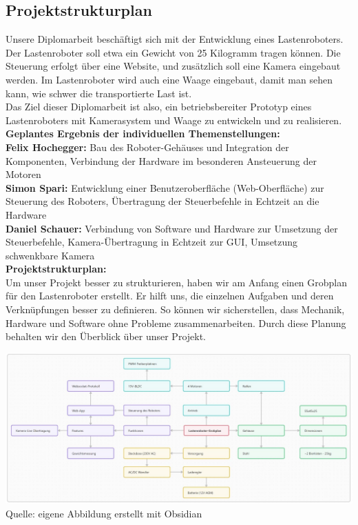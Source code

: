 \documentclass[ngerman,12pt,a4paper]{article}
\begin{document}
		\subsection{Projektstrukturplan} %
		Unsere Diplomarbeit beschäftigt sich mit der Entwicklung eines Lastenroboters. Der Lastenroboter soll etwa ein Gewicht von 25 Kilogramm tragen können. Die Steuerung erfolgt über eine Website, und zusätzlich soll eine Kamera eingebaut werden. Im Lastenroboter wird auch eine Waage eingebaut, damit man sehen kann, wie schwer die transportierte Last ist. \\ Das Ziel dieser Diplomarbeit ist also, ein betriebsbereiter Prototyp eines Lastenroboters mit Kamerasystem und Waage zu entwickeln und zu realisieren. \\[0.4cm]
		\textbf{Geplantes Ergebnis der individuellen Themenstellungen:} \\
		\textbf{Felix Hochegger:}
		Bau des Roboter-Gehäuses und Integration der Komponenten, Verbindung der Hardware im besonderen Ansteuerung der Motoren \\
		\textbf{Simon Spari:}
		Entwicklung einer Benutzeroberfläche (Web-Oberfläche) zur Steuerung des Roboters, Übertragung der Steuerbefehle in Echtzeit an die Hardware \\
		\textbf{Daniel Schauer:}
		Verbindung von Software und Hardware zur Umsetzung der Steuerbefehle, Kamera-Übertragung in Echtzeit zur GUI, Umsetzung schwenkbare Kamera\\[0.4cm]
		\textbf{Projektstrukturplan:} \\
		Um unser Projekt besser zu strukturieren, haben wir am Anfang einen Grobplan für den Lastenroboter erstellt. Er hilft uns, die einzelnen Aufgaben und deren Verknüpfungen besser zu definieren. So können wir sicherstellen, dass Mechanik, Hardware und Software ohne Probleme zusammenarbeiten. Durch diese Planung behalten wir den Überblick über unser Projekt.
		\begin{center}
			\begin{minipage}{\textwidth}
				\centering
				\includegraphics[scale=0.42]{Pictures/Projekt-Grobplan}
				\label{fig:sprojekt_grobplan}
				\vspace{-4pt}
				{\small Quelle: eigene Abbildung erstellt mit Obsidian}
			\end{minipage}
		\end{center}
		\newpage
\end{document}
